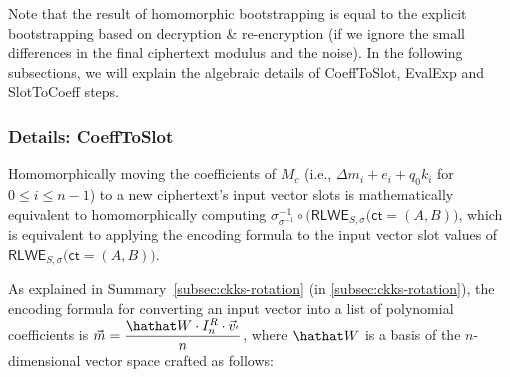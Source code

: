 Note that the result of homomorphic bootstrapping is equal to the explicit bootstrapping based on decryption \& re-encryption (if we ignore the small differences in the final ciphertext modulus and the noise). In the following subsections, we will explain the algebraic details of \textsf{CoeffToSlot}, \textsf{EvalExp} and \textsf{SlotToCoeff} steps. 

\subsubsection{Details: \textsf{CoeffToSlot}}
\label{subsubsec:ckks-bootstrapping-coefftoslot-details}

Homomorphically moving the coefficients of $M_c$ (i.e., $\Delta m_i + e_i + q_0k_i$ for $0 \leq i \leq n - 1$) to a new ciphertext's input vector slots is mathematically equivalent to homomorphically computing $\sigma^{-1}_{\sigma^{-1}} \circ (\textsf{RLWE}_{S, \sigma}\bm{(}\textsf{ct} = (A, B)\bm)$, which is equivalent to applying the encoding formula to the input vector slot values of $\textsf{RLWE}_{S, \sigma}\bm{(}\textsf{ct} = (A, B)\bm)$. 



As explained in Summary~\ref*{subsec:ckks-rotation} (in \autoref{subsec:ckks-rotation}), the encoding formula for converting an input vector into a list of polynomial coefficients is $\vec{m} = \dfrac{\hathat W \cdot I_n^R \cdot \vec{v}_{'}}{n}$, where $\hathat W$ is a basis of the $n$-dimensional vector space crafted as follows: 

$ $


